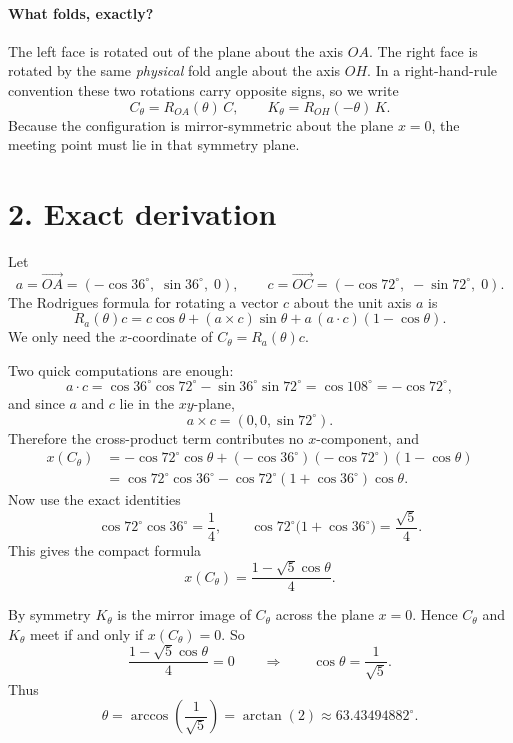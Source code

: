 \documentclass[11pt]{article}
\begin{document}
\paragraph{What folds, exactly?}
The left face is rotated out of the plane about the axis \(OA\). The right face is rotated by the same \emph{physical} fold angle about the axis \(OH\). In a right-hand-rule convention these two rotations carry opposite signs, so we write
\[
C_\theta = R_{OA}(\theta)\,C,
\qquad
K_\theta = R_{OH}(-\theta)\,K.
\]
Because the configuration is mirror-symmetric about the plane \(x=0\), the meeting point must lie in that symmetry plane.

\section*{2. Exact derivation}
Let
\[
a = \overrightarrow{OA} = (-\cos 36^\circ,\; \sin 36^\circ,\; 0),
\qquad
c = \overrightarrow{OC} = (-\cos 72^\circ,\; -\sin 72^\circ,\; 0).
\]
The Rodrigues formula for rotating a vector \(c\) about the unit axis \(a\) is
\[
R_a(\theta)c = c\cos\theta + (a\times c)\sin\theta + a\,(a\cdot c)(1-\cos\theta).
\]
We only need the \(x\)-coordinate of \(C_\theta=R_a(\theta)c\).

Two quick computations are enough:
\[
a\cdot c = \cos 36^\circ\cos 72^\circ - \sin 36^\circ\sin 72^\circ
=\cos 108^\circ = -\cos 72^\circ,
\]
and since \(a\) and \(c\) lie in the \(xy\)-plane,
\[
a\times c = (0,0,\sin 72^\circ).
\]
Therefore the cross-product term contributes no \(x\)-component, and
\begin{align*}
 x(C_\theta)
 &= -\cos 72^\circ\cos\theta + (-\cos 36^\circ)(-\cos 72^\circ)(1-\cos\theta)\\[0.3em]
 &= \cos 72^\circ\cos 36^\circ - \cos 72^\circ(1+\cos 36^\circ)\cos\theta.
\end{align*}
Now use the exact identities
\[
\cos 72^\circ\cos 36^\circ = \frac14,
\qquad
\cos 72^\circ\bigl(1+\cos 36^\circ\bigr)=\frac{\sqrt5}{4}.
\]
This gives the compact formula
\[
\boxed{x(C_\theta)=\frac{1-\sqrt5\cos\theta}{4}.}
\]

By symmetry \(K_\theta\) is the mirror image of \(C_\theta\) across the plane \(x=0\). Hence \(C_\theta\) and \(K_\theta\) meet if and only if \(x(C_\theta)=0\). So
\[
\frac{1-\sqrt5\cos\theta}{4}=0
\qquad\Longrightarrow\qquad
\cos\theta=\frac1{\sqrt5}.
\]
Thus
\[
\boxed{\theta = \arccos\!\left(\frac{1}{\sqrt5}\right)=\arctan(2)\approx 63.43494882^\circ.}
\]
\end{document}
